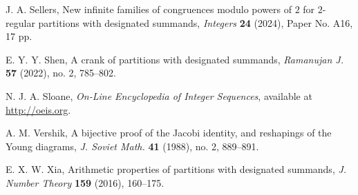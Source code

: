 \documentclass[12pt,reqno]{amsart}
\numberwithin{equation}{section}
\theoremstyle{plain}
\theoremstyle{definition}
\theoremstyle{named}
\begin{document}
\begin{thebibliography}{99}
	J. A. Sellers, New infinite families of congruences modulo powers of $2$ for $2$-regular partitions with designated summands, \textit{Integers} \textbf{24} (2024), Paper No. A16, 17 pp.
	
	E. Y. Y. Shen, A crank of partitions with designated summands, \textit{Ramanujan J.} \textbf{57} (2022), no. 2, 785--802.
	
	N. J. A. Sloane, \textit{On-Line Encyclopedia of Integer Sequences}, available at \url{http://oeis.org}.
	
	A. M. Vershik, A bijective proof of the Jacobi identity, and reshapings of the Young diagrams, \textit{J. Soviet Math.} \textbf{41} (1988), no. 2, 889--891.
	
	E. X. W. Xia, Arithmetic properties of partitions with designated summands, \textit{J. Number Theory} \textbf{159} (2016), 160--175.
	
\end{thebibliography}
	
\end{document}
